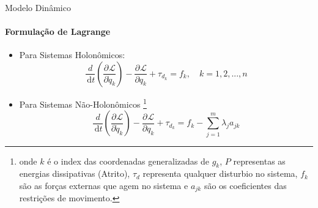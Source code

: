 \documentclass[aspectratio=169]{beamer}
\newcommand{\df}[1]{\,\mathrm{d}#1}
\newcommand{\parcial}[3]{\dfrac{\partial^{#1}#2}{\partial #3^{#1}}}
\begin{document}
\begin{frame}{Modelo Dinâmico}
    \framesubtitle{Formulação de Lagrange}

    \begin{itemize}
        \item Para Sistemas Holonômicos:
              \begin{equation}
                  \frac{d}{\df{t}}\left( \parcial{}{\mathcal{L}}{\dot{q}_k}\right)
                  -\parcial{}{\mathcal{L}}{q_k}
                  +\tau_{d_k}
                  = f_k, \quad k = 1,2,...,n
              \end{equation}

        \item Para Sistemas Não-Holonômicos \footnote{onde $k$ é o index das coordenadas generalizadas de $g_k$, $P$ representas as energias dissipativas (Atrito),
                  $\tau_d$ representa qualquer disturbio no sistema, $f_k$ são as forças externas que agem no sistema e $a_{jk}$ são os coeficientes das restrições de movimento.}
              \begin{equation}
                  \frac{d}{\df{t}}\left( \parcial{}{\mathcal{L}}{\dot{q}_k}\right)
                  -\parcial{}{\mathcal{L}}{q_k}
                  +\tau_{d_k}
                  = f_k - \sum\limits^{m}_{j=1}\lambda_j a_{jk}
              \end{equation}
    \end{itemize}
\end{frame}
\end{document}
